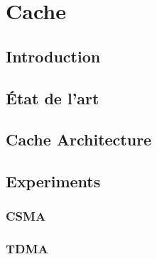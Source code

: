 \chapter{Cache} %
\label{cha:cache}

\minitoc

\lipsum

\section{Introduction} %
\label{sec:cache_introduction}

\lipsum


\section{État de l'art} %
\label{sec:_tat_de_l_art}

\lipsum



\section{Cache Architecture} %
\label{sec:cache_architecture}

\lipsum


\section{Experiments} %
\label{sec:cache_experiments}

\lipsum

\subsection{CSMA} %
\label{sub:csma}

\lipsum


\subsection{TDMA} %
\label{sub:tdma}

\lipsum



